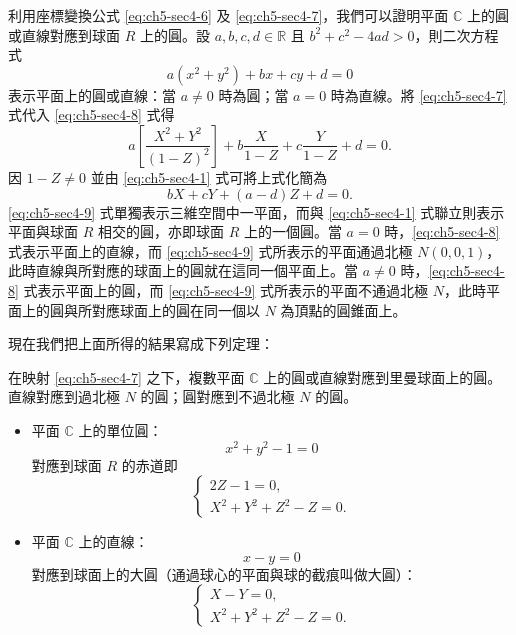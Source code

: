 利用座標變換公式 \eqref{eq:ch5-sec4-6} 及 \eqref{eq:ch5-sec4-7}，我們可以證明平面 $\mathbb{C}$ 上的圓或直線對應到球面 $R$ 上的圓。設 $a, b, c, d \in \mathbb{R}$ 且 $b^2+c^2-4ad > 0$，則二次方程式
\begin{equation}
a(x^2+y^2)+bx+cy+d = 0 \label{eq:ch5-sec4-8}
\end{equation}
表示平面上的圓或直線：當 $a \neq 0$ 時為圓；當 $a=0$ 時為直線。將 \eqref{eq:ch5-sec4-7} 式代入 \eqref{eq:ch5-sec4-8} 式得
\[
a\left[\frac{X^2+Y^2}{(1-Z)^2}\right] + b\frac{X}{1-Z} + c\frac{Y}{1-Z} + d = 0.
\]
因 $1-Z \neq 0$ 並由 \eqref{eq:ch5-sec4-1} 式可將上式化簡為
\begin{equation}
bX+cY+(a-d)Z+d = 0. \label{eq:ch5-sec4-9}
\end{equation}
\eqref{eq:ch5-sec4-9} 式單獨表示三維空間中一平面，而與 \eqref{eq:ch5-sec4-1} 式聯立則表示平面與球面 $R$ 相交的圓，亦即球面 $R$ 上的一個圓。當 $a=0$ 時，\eqref{eq:ch5-sec4-8} 式表示平面上的直線，而 \eqref{eq:ch5-sec4-9} 式所表示的平面通過北極 $N(0, 0, 1)$，此時直線與所對應的球面上的圓就在這同一個平面上。當 $a \neq 0$ 時，\eqref{eq:ch5-sec4-8} 式表示平面上的圓，而 \eqref{eq:ch5-sec4-9} 式所表示的平面不通過北極 $N$，此時平面上的圓與所對應球面上的圓在同一個以 $N$ 為頂點的圓錐面上。

現在我們把上面所得的結果寫成下列定理：

\begin{theorem}[定理 II]
在映射 \eqref{eq:ch5-sec4-7} 之下，複數平面 $\mathbb{C}$ 上的圓或直線對應到里曼球面上的圓。直線對應到過北極 $N$ 的圓；圓對應到不過北極 $N$ 的圓。
\end{theorem}

\begin{example}
\begin{itemize}
  \item[(i)] 平面 $\mathbb{C}$ 上的單位圓：
  \[
  x^2+y^2-1=0
  \]
  對應到球面 $R$ 的赤道即
  \[
  \begin{cases}
  2Z-1 = 0, \\
  X^2+Y^2+Z^2-Z = 0.
  \end{cases}
  \]
  \item[(ii)] 平面 $\mathbb{C}$ 上的直線：
  \[
  x-y = 0
  \]
  對應到球面上的大圓（通過球心的平面與球的截痕叫做大圓）：
  \[
  \begin{cases}
  X-Y = 0, \\
  X^2+Y^2+Z^2-Z = 0.
  \end{cases}
  \]
\end{itemize}
\end{example}

